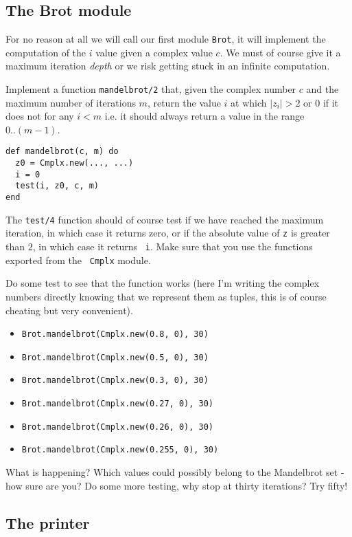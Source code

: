 \documentclass[a4paper,11pt]{article}
\begin{document}
\subsection{The Brot module}

For no reason at all we will call our first module {\tt Brot}, it will
implement the computation of the $i$ value given a complex value
$c$. We must of course give it a maximum iteration {\em depth} or we
risk getting stuck in an infinite computation.

Implement a function {\tt mandelbrot/2} that, given the complex number
$c$ and the maximum number of iterations $m$, return the value $i$ at
which $|z_i| > 2$ or $0$ if it does not for any $i < m$ i.e. it
should always return a value in the range $0..(m-1)$.

\begin{verbatim}
def mandelbrot(c, m) do
  z0 = Cmplx.new(..., ...)
  i = 0
  test(i, z0, c, m)
end
\end{verbatim}

The {\tt test/4} function should of course test if we have reached the
maximum iteration, in which case it returns zero, or if the absolute
value of {\tt z} is greater than $2$, in which case it returns {\tt
  i}. Make sure that you use the functions exported from the {\tt
  Cmplx} module.

Do some test to see that the function works (here I'm writing the
complex numbers directly knowing that we represent them as tuples,
this is of course cheating but very convenient).

\begin{itemize}
 \item {\tt Brot.mandelbrot(Cmplx.new(0.8, 0), 30)}
 \item {\tt Brot.mandelbrot(Cmplx.new(0.5, 0), 30)}
 \item {\tt Brot.mandelbrot(Cmplx.new(0.3, 0), 30)}
 \item {\tt Brot.mandelbrot(Cmplx.new(0.27, 0), 30)} 
 \item {\tt Brot.mandelbrot(Cmplx.new(0.26, 0), 30)}
 \item {\tt Brot.mandelbrot(Cmplx.new(0.255, 0), 30)}
\end{itemize}

What is happening? Which values could possibly belong to the
Mandelbrot set - how sure are you? Do some more testing, why stop at
thirty iterations? Try fifty!


\subsection{The printer}
\end{document}

